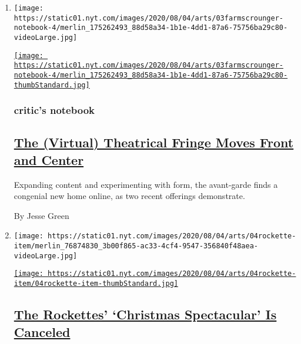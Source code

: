 \begin{enumerate}
\def\labelenumi{\arabic{enumi}.}
\item
  \texttt{[image: https://static01.nyt.com/images/2020/08/04/arts/03farmscrounger-notebook-4/merlin\_175262493\_88d58a34-1b1e-4dd1-87a6-75756ba29c80-videoLarge.jpg]}

  \href{/2020/08/03/theater/virtual-theater.html}{\texttt{[image: https://static01.nyt.com/images/2020/08/04/arts/03farmscrounger-notebook-4/merlin\_175262493\_88d58a34-1b1e-4dd1-87a6-75756ba29c80-thumbStandard.jpg]}}

  \hypertarget{critics-notebook}{%
  \subsubsection{critic's notebook}\label{critics-notebook}}

  \hypertarget{the-virtual-theatrical-fringe-moves-front-and-center}{%
  \subsection{\texorpdfstring{\href{/2020/08/03/theater/virtual-theater.html}{The
  (Virtual) Theatrical Fringe Moves Front and
  Center}}{The (Virtual) Theatrical Fringe Moves Front and Center}}\label{the-virtual-theatrical-fringe-moves-front-and-center}}

  Expanding content and experimenting with form, the avant-garde finds a
  congenial new home online, as two recent offerings demonstrate.

  By Jesse Green
\item
  \texttt{[image: https://static01.nyt.com/images/2020/08/04/arts/04rockette-item/merlin\_76874830\_3b00f865-ac33-4cf4-9547-356840f48aea-videoLarge.jpg]}

  \href{/2020/08/04/theater/radio-city-rockettes-christmas-canceled.html}{\texttt{[image: https://static01.nyt.com/images/2020/08/04/arts/04rockette-item/04rockette-item-thumbStandard.jpg]}}

  \hypertarget{the-rockettes-christmas-spectacular-is-canceled}{%
  \subsection{\texorpdfstring{\href{/2020/08/04/theater/radio-city-rockettes-christmas-canceled.html}{The
  Rockettes' `Christmas Spectacular' Is
  Canceled}}{The Rockettes' `Christmas Spectacular' Is Canceled}}\label{the-rockettes-christmas-spectacular-is-canceled}}


\end{enumerate}
